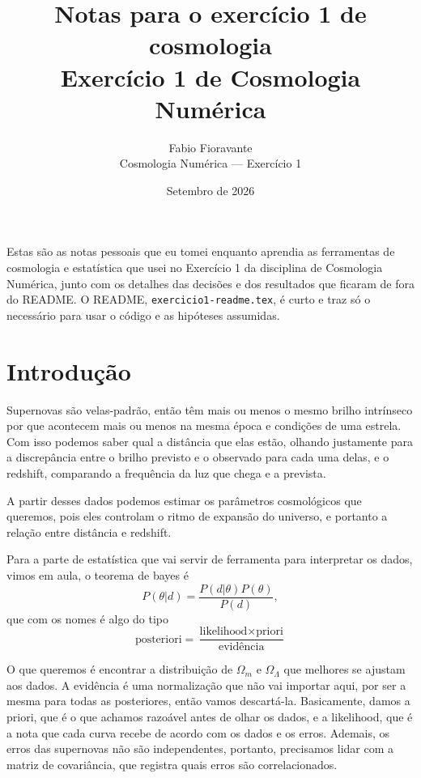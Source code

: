 \documentclass[11pt,a4paper]{article}
\title{\textbf{Notas para o exercício 1 de cosmologia}\\[0.4em]
\large Exercício 1 de Cosmologia Numérica}
\author{Fabio Fioravante \\ \small Cosmologia Numérica --- Exercício 1}
\date{Setembro de 2026}
\begin{document}
\maketitle

Estas são as notas pessoais que eu tomei enquanto aprendia as ferramentas de cosmologia e estatística que usei no Exercício 1 da disciplina
de Cosmologia Numérica, junto com os detalhes das decisões e dos resultados que ficaram de fora do README. O README,
\texttt{exercicio1-readme.tex}, é curto e traz só o necessário para usar o código e as hipóteses assumidas.

\tableofcontents

\section{Introdução}
\label{sec:historia}

Supernovas são velas-padrão, então têm mais ou menos o mesmo brilho intrínseco por que acontecem 
mais ou menos na mesma época e condições de uma estrela. Com isso podemos saber qual a distância que elas estão, 
olhando justamente para a discrepância entre o brilho previsto e o observado para cada uma delas, e o redshift, comparando
a frequência da luz que chega e a prevista.

A partir desses dados podemos estimar os parâmetros cosmológicos que queremos, pois eles controlam o ritmo de expansão do universo, e
portanto a relação entre distância e redshift.

Para a parte de estatística que vai servir de ferramenta para interpretar os dados, vimos em aula, o teorema de bayes é 
\begin{equation}
    P(\theta|d)=\frac{P(d|\theta) P(\theta)}{P(d)},
\end{equation}
que com os nomes é algo do tipo
\begin{equation}
    \text{posteriori}=\frac{\text{likelihood}\times\text{priori}}{\text{evidência}}
\end{equation}

O que queremos é encontrar a distribuição de $\Omega_m$ e $\Omega_\Lambda$ que melhores se ajustam aos dados. A evidência é uma normalização que não vai importar aqui, por ser a mesma para todas as posteriores, então vamos descartá-la.
Basicamente, damos a priori, que é o que achamos razoável antes de olhar os dados, e a likelihood, que é a nota que cada curva recebe de 
acordo com os dados e os erros. Ademais, os erros das supernovas não são independentes, portanto, precisamos lidar com a matriz de covariância, que registra quais erros são correlacionados.
\end{document}
